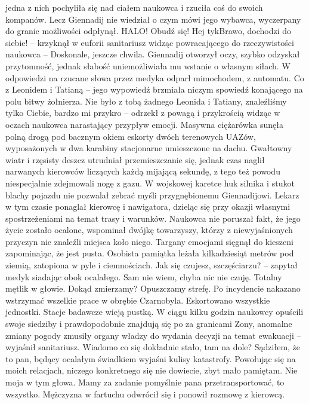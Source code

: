 \documentclass[../MAIN.tex]{subfiles}
\begin{document}
jedna z nich pochyliła się nad ciałem naukowca i rzuciła coś do swoich kompanów. Lecz Giennadij nie wiedział o czym mówi jego wybawca, wyczerpany do granic możliwości odpłynął. 
\sx HALO! Obudź się! Hej ty\3kBrawo, dochodzi do siebie! -- krzyknął w euforii sanitariusz widząc powracającego do rzeczywistości naukowca -- Doskonale, jeszcze chwila. 
\qd
% 
Giennadij otworzył oczy, szybko odzyskał przytomność, jednak słabość uniemożliwiała mu wstanie o własnym siłach. W odpowiedzi na rzucane słowa przez medyka odparł mimochodem, z automatu.
\sx Co z Leonidem i Tatianą -- jego wypowiedź brzmiała niczym spowiedź konającego na polu bitwy żołnierza. 
\xx Nie było z tobą żadnego Leonida i Tatiany, znaleźliśmy tylko Ciebie, bardzo mi przykro -- odrzekł z powagą i przykrością widząc w oczach naukowca narastający przypływ emocji.
\qd
% 
% 
Masywna ciężarówka sunęła polną drogą pod bacznym okiem eskorty dwóch terenowych UAZów, wyposażonych w dwa karabiny stacjonarne umieszczone na dachu. Gwałtowny wiatr i rzęsisty deszcz utrudniał przemieszczanie się, jednak czas naglił narwanych kierowców liczących każdą mijającą sekundę, z tego też powodu niespecjalnie zdejmowali nogę z gazu. W wojskowej karetce huk silnika i stukot blachy pojazdu nie pozwalał zebrać myśli przygnębionemu Giennadijowi. Lekarz w tym czasie ponaglał kierowcę i nawigatora, dzieląc się przy okazji własnymi spostrzeżeniami na temat trasy i warunków. Naukowca nie poruszał fakt, że jego życie zostało ocalone, wspominał dwójkę towarzyszy, którzy z niewyjaśnionych przyczyn nie znaleźli miejsca koło niego. Targany emocjami sięgnął do kieszeni zapominając, że jest pusta. Osobista pamiątka leżała kilkadziesiąt metrów pod ziemią, zatopiona w pyle i ciemnościach. 
\sx Jak się czujesz, szczęściarzu? -- zapytał medyk siadając obok ocalałego. 
\xx Sam nie wiem, chyba nic nie czuję. Totalny mętlik w głowie. Dokąd zmierzamy? 
\xx Opuszczamy strefę. Po incydencie nakazano wstrzymać wszelkie prace w obrębie Czarnobyla. 
Eskortowano wszystkie jednostki. Stacje badawcze wieją pustką. W ciągu kilku godzin naukowcy opuścili swoje siedziby i prawdopodobnie znajdują się po za granicami Zony, anomalne zmiany pogody zmusiły organy władzy do wydania decyzji na temat ewakuacji -- wyjaśnił sanitariusz.
\xx Wiadomo co się dokładnie stało, tam na dole? 
\xx Sądziłem, że to pan, będący ocalałym świadkiem wyjaśni kulisy katastrofy. 
\xx Powołując się na moich relacjach, niczego konkretnego się nie dowiecie, zbyt mało pamiętam. 
\xx Nie moja w tym głowa. Mamy za zadanie pomyślnie pana przetransportować, to wszystko.
\qd
Mężczyzna w fartuchu odwrócił się i ponowił rozmowę z kierowcą.
\end{document}
